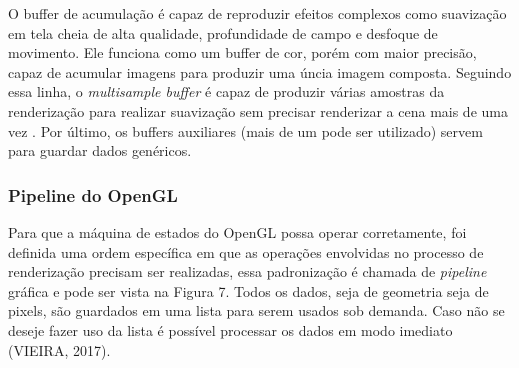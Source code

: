     \begin{figure}[h!]
		\centering
	\end{figure}
	\nocite{stcbuf}

O buffer de acumulação é capaz de reproduzir efeitos complexos como suavização em tela cheia de alta qualidade, profundidade de campo e desfoque de movimento. Ele funciona como um buffer de cor, porém com maior precisão, capaz de acumular imagens para produzir uma úncia imagem composta. Seguindo essa linha, o \textit{multisample buffer} é capaz de produzir várias amostras da renderização para realizar suavização sem precisar renderizar a cena mais de uma vez \cite{GLSLBook}. Por último, os buffers auxiliares (mais de um pode ser utilizado) servem para guardar dados genéricos.

\subsubsection{Pipeline do OpenGL}
\label{sec:pipeline-opengl}

Para que a máquina de estados do OpenGL possa operar corretamente, foi definida uma ordem específica em que as operações envolvidas no processo de renderização precisam ser realizadas, essa padronização é chamada de \textit{pipeline} gráfica \cite{GLSLBook} e pode ser vista na Figura 7. Todos os dados, seja de geometria seja de pixels, são guardados em uma lista para serem usados sob demanda. Caso não se deseje fazer uso da lista é possível processar os dados em modo imediato (VIEIRA, 2017)\nocite{pipelnRef}.

